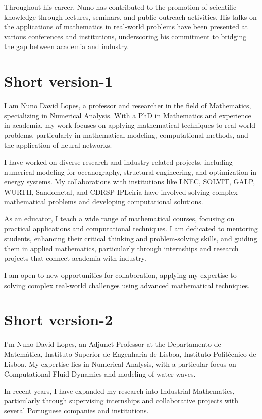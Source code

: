 \documentclass[a4paper,11pt]{article}
\begin{document}
Throughout his career, Nuno has contributed to the promotion of scientific knowledge through lectures, seminars, and public outreach activities. His talks on the applications of mathematics in real-world problems have been presented at various conferences and institutions, underscoring his commitment to bridging the gap between academia and industry.

\section{Short version-1}

I am Nuno David Lopes, a professor and researcher in the field of Mathematics, specializing in Numerical Analysis. With a PhD in Mathematics and experience in academia, my work focuses on applying mathematical techniques to real-world problems, particularly in mathematical modeling, computational methods, and the application of neural networks.

I have worked on diverse research and industry-related projects, including numerical modeling for oceanography, structural engineering, and optimization in energy systems. My collaborations with institutions like LNEC, SOLVIT, GALP, WURTH, Sandometal, and CDRSP-IPLeiria have involved solving complex mathematical problems and developing computational solutions.

As an educator, I teach a wide range of mathematical courses, focusing on practical applications and computational techniques. I am dedicated to mentoring students, enhancing their critical thinking and problem-solving skills, and guiding them in applied mathematics, particularly through internships and research projects that connect academia with industry.

I am open to new opportunities for collaboration, applying my expertise to solving complex real-world challenges using advanced mathematical techniques.

\section{Short version-2}
I’m Nuno David Lopes, an Adjunct Professor at the Departamento de Matemática, Instituto Superior de Engenharia de Lisboa, Instituto Politécnico de Lisboa. My expertise lies in Numerical Analysis, with a particular focus on Computational Fluid Dynamics and modeling of water waves.

In recent years, I have expanded my research into Industrial Mathematics, particularly through supervising internships and collaborative projects with several Portuguese companies and institutions.
\end{document}
